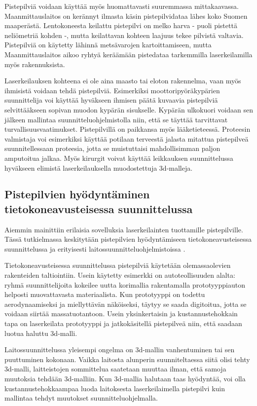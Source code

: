 Pistepilviä voidaan käyttää myös huomattavasti suuremmassa mittakaavassa. Maanmittauslaitos on kerännyt ilmasta käsin pistepilvidataa lähes koko Suomen maaperästä. Lentokoneesta keilattu pistepilvi on melko harva - puoli pistettä neliömetriä kohden -, mutta keilattavan kohteen laajuus tekee pilvistä valtavia. Pistepilviä on käytetty lähinnä metsävarojen kartoittamiseen, mutta Maanmittauslaitos aikoo ryhtyä keräämään pistedataa tarkemmilla laserkeilamilla myös rakennuksista. \cite{hs}

Laserkeilauksen kohteena ei ole aina maasto tai eloton rakennelma, vaan myös ihmisistä voidaan tehdä pistepilviä. Esimerkiksi moottoripyöräkypärien suunnittelija voi käyttää hyväkseen ihmisen päätä kuvaavia pistepilviä selvittääkseen sopivan muodon kypärän sisukselle. Kypärän ulkokuori voidaan sen jälkeen mallintaa suunnitteluohjelmistolla niin, että se täyttää tarvittavat turvallisuusvaatimukset. Pistepilvillä on paikkansa myös lääketieteessä. Proteesin valmistaja voi esimerkiksi käyttää potilaan terveestä jalasta mitattua pistepilveä suunnitellessaan proteesia, jotta se muistuttaisi mahdollisimman paljon amputoitua jalkaa. Myös kirurgit voivat käyttää leikkauksen suunnittelussa hyväkseen elimistä laserkeilauksella muodostettuja 3d-malleja. \cite{saxena}  

\subsection{Pistepilvien hyödyntäminen tietokoneavusteisessa suunnittelussa}

Aiemmin mainittiin erilaisia sovelluksia laserkeilainten tuottamille pistepilville. Tässä tutkielmassa keskitytään pistepilvien hyödyntämiseen tietokoneavusteisessa suunnittelussa  ja erityisesti laitossuunnitteluohjelmistoissa .

Tietokoneavusteisessa suunnittelussa pistepilviä käytetään olemassaolevien rakenteiden taltiointiin. Usein käytetty esimerkki on autoteollisuuden alalta: ryhmä suunnittelijoita kokeilee uutta korimallia rakentamalla prototyyppiauton helposti muovattavasta materiaalista. Kun prototyyppi on todettu aerodynaamiseksi ja miellyttävän näköiseksi, täytyy se saada digitoitua, jotta se voidaan siirtää massatuotantoon. Usein yksinkertaisin ja kustannustehokkain tapa on laserkeilata prototyyppi ja jatkokäsitellä pistepilveä niin, että saadaan luotua haluttu 3d-malli.

Laitossuunnittelussa yleisempi ongelma on 3d-mallin vanhentuminen tai sen puuttuminen kokonaan. Vaikka laitosta alunperin suunniteltaessa siitä olisi tehty 3d-malli, laitteistojen sommittelua saatetaan muuttaa ilman, että samoja muutoksia tehdään 3d-malliin. Kun 3d-mallia halutaan taas hyödyntää, voi olla kustannustehokkaampaa luoda laitoksesta laserkeilaimella pistepilvi kuin mallintaa tehdyt muutokset suunnitteluohjelmalla. \cite{Piipponen}


